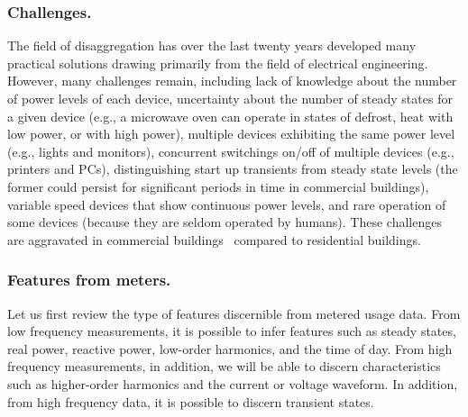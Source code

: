 \subsubsection*{Challenges.}
The field of disaggregation has over the last twenty years
 developed many practical solutions drawing primarily from the field of
electrical engineering. However, many challenges remain, including
lack of knowledge about the number of power levels of each device, uncertainty
about the number of steady states for a given device (e.g., a microwave
oven can operate in states of defrost, heat with low power, or with high power),
multiple devices exhibiting the same power level (e.g., lights and monitors),
concurrent switchings on/off of multiple devices (e.g., printers and PCs),
distinguishing start up transients from steady state levels (the former
could persist for significant periods in time in commercial buildings),
variable speed devices that show continuous power levels,
and rare operation of some devices (because they are seldom operated by humans).
These challenges are aggravated
in commercial buildings~\cite{norford1996non}
compared to residential buildings.

%

\subsubsection*{Features from meters.}
Let us first review the type of features discernible from metered usage data.
From low frequency measurements, it is possible to infer features such as
steady states, real power, reactive power,
low-order harmonics, and the time of day.
From high frequency measurements, in addition, we will be able to discern
characteristics
such as higher-order harmonics and the current or voltage waveform.
In addition, from high frequency data, it is possible to discern transient states.


